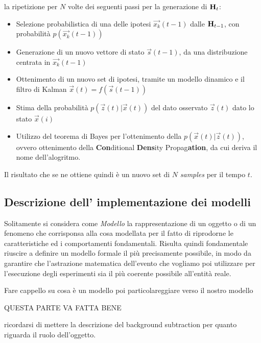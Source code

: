 la ripetizione per $N$ volte dei seguenti passi per la generazione di $\mbox{{\bfseries H}}_t$:
\begin{itemize}
\item Selezione probabilistica di una delle ipotesi $\overrightarrow{x_k}(t-1)$ dalle $\mbox{{\bfseries H}}_{t-1}$, con probabilità $p(\overrightarrow{x_k}(t-1))$
\item Generazione di un nuovo vettore di stato $\overrightarrow{s}(t-1)$, da una distribuzione centrata in   $\overrightarrow{x_k}(t-1)$
\item Ottenimento di un nuovo set di ipotesi, tramite un modello dinamico e il filtro di Kalman $\overrightarrow{x}(t)=f(\overrightarrow{s}(t-1))$
\item Stima della probabilità $p(\overrightarrow{z}(t)|\overrightarrow{x}(t))$ del dato osservato $\overrightarrow{z}(t)$ dato lo stato $\overrightarrow{x}(i)$
\item Utilizzo del teorema di Bayes per l'ottenimento della $p(\overrightarrow{x}(t)|\overrightarrow{z}(t))$, ovvero ottenimento della \textbf{Con}ditional \textbf{Dens}ity Propag\textbf{ation}, da cui deriva il nome dell'alogritmo.
\end{itemize}

Il risultato che se ne ottiene quindi è un nuovo set di $N$ \textit{samples} per il tempo $t$.
\subsection{Descrizione dell' implementazione dei modelli} \label{sec:modelli}
Solitamente si considera come \textit{Modello} la rappresentazione di un oggetto o di un fenomeno che corrisponsa alla cosa modellata per il fatto  di riprodorne le caratteristiche ed i comportamenti fondamentali. 
Risulta quindi fondamentale riuscire a definire un modello formale il più precisamente possibile, in modo da garantire che l'astrazione matematica dell'evento che vogliamo poi utilizzare per l'esecuzione degli esperimenti sia il più coerente possibile all'entità reale. 

Fare cappello su cosa è un modello poi particolareggiare verso il nostro modello

QUESTA PARTE VA FATTA BENE

ricordarsi di mettere la descrizione del background subtraction per quanto riguarda il ruolo dell'oggetto.

